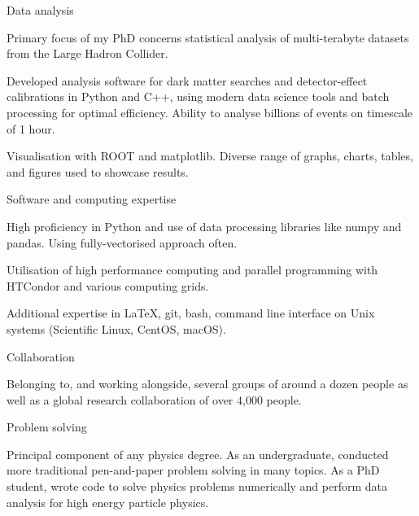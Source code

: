 
\begin{cventries}

    \cventry
    {} %
    {Data analysis} %
    {} %
    {} %
    {
      \begin{cvitems}
        \item {Primary focus of my PhD concerns statistical analysis of multi-terabyte datasets from the Large Hadron Collider.}
        \item {Developed analysis software for dark matter searches and detector-effect calibrations in Python and C++, using modern data science tools and batch processing for optimal efficiency. Ability to analyse billions of events on timescale of 1 hour.}
        \item{Visualisation with ROOT and matplotlib. Diverse range of graphs, charts, tables, and figures used to showcase results.}
        \end{cvitems}
    }

    \cventry
    {} %
    {Software and computing expertise} %
    {} %
    {} %
    {
      \begin{cvitems}
        \item {High proficiency in Python and use of data processing libraries like numpy and pandas. Using fully-vectorised approach often.}
        \item {Utilisation of high performance computing and parallel programming with HTCondor and various computing grids.}
        \item{Additional expertise in LaTeX, git, bash, command line interface on Unix systems (Scientific Linux, CentOS, macOS).}
        \end{cvitems}
    }

    \cventry
    {}
    {Collaboration}
    {}
    {}
    {
      \begin{cvitems}
        \item {Belonging to, and working alongside, several groups of around a dozen people as well as a global research collaboration of over 4,000 people.}
        \end{cvitems}
    }

    \cventry
    {}
    {Problem solving}
    {}
    {}
    {
      \begin{cvitems}
        \item {Principal component of any physics degree. As an undergraduate, conducted more traditional pen-and-paper problem solving in many topics. As a PhD student, wrote code to solve physics problems numerically and perform data analysis for high energy particle physics.}
        \end{cvitems}
    }


\end{cventries}
